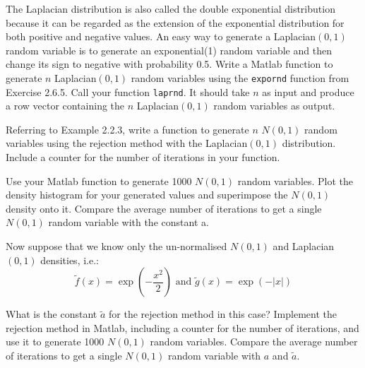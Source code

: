 \begin{exercise}
The Laplacian distribution is also called the double exponential distribution because it can be regarded as the extension of the exponential distribution for both positive and negative values. An easy way to generate a Laplacian$(0, 1)$ random variable is to generate an exponential(1) random variable and then change its sign to negative with probability 0.5. Write a Matlab function to generate $n$ Laplacian$(0, 1)$ random variables using the {\tt expornd} function from Exercise 2.6.5. Call your function {\tt laprnd}. It should take $n$ as input and produce a row vector containing the $n$ Laplacian$(0, 1)$ random variables as output.
\end{exercise}

\begin{exercise}
\begin{asparaenum}[(a)]
\item	Referring to Example 2.2.3, write a \Matlab function to generate $n$ $N(0, 1)$ random variables using the rejection method with the Laplacian$(0, 1)$ distribution. Include a counter for the number of iterations in your function.

\item	Use your Matlab function to generate 1000 $N(0, 1)$ random variables. Plot the density histogram for your generated values and superimpose the $N(0, 1)$ density onto it. Compare the average number of iterations to get a single $N(0, 1)$ random variable with the constant a.

\item	Now suppose that we know only the un-normalised $N(0, 1)$ and Laplacian$(0, 1)$ densities, i.e.:
$$\tilde{f}(x)=\exp\left( -\frac{x^2}{2}\right)\textrm{ and }\tilde{g}(x)=\exp(-|x|)$$


What is the constant $\tilde{a}$ for the rejection method in this case? Implement the rejection method in Matlab, including a counter for the number of iterations, and use it to generate 1000 $N(0, 1)$ random variables. Compare the average number of iterations to get a single $N(0, 1)$ random variable with $a$ and $\tilde{a}$.
\end{asparaenum}
\end{exercise}

